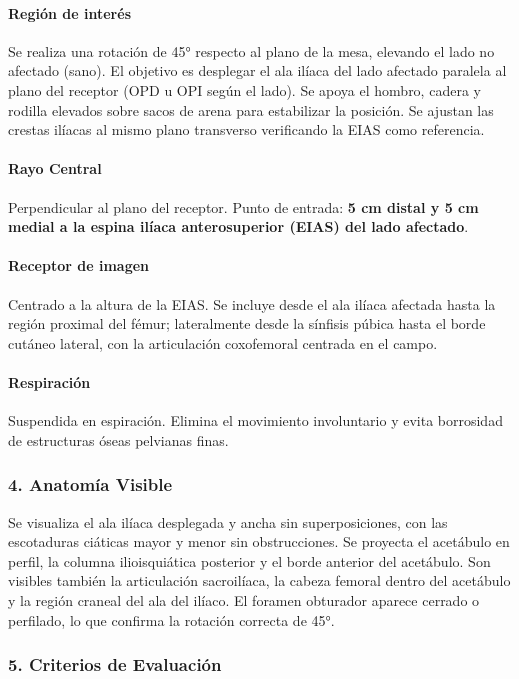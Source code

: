 	
	\paragraph{Región de interés}
	Se realiza una rotación de 45° respecto al plano de la mesa, elevando el lado no afectado (sano). El objetivo es desplegar el ala ilíaca del lado afectado paralela al plano del receptor (OPD u OPI según el lado). Se apoya el hombro, cadera y rodilla elevados sobre sacos de arena para estabilizar la posición. Se ajustan las crestas ilíacas al mismo plano transverso verificando la EIAS como referencia.
	
	\paragraph{Rayo Central}
	Perpendicular al plano del receptor. Punto de entrada: \textbf{5 cm distal y 5 cm medial a la espina ilíaca anterosuperior (EIAS) del lado afectado}.
	
	\paragraph{Receptor de imagen}
	Centrado a la altura de la EIAS. Se incluye desde el ala ilíaca afectada hasta la región proximal del fémur; lateralmente desde la sínfisis púbica hasta el borde cutáneo lateral, con la articulación coxofemoral centrada en el campo.
	
	\paragraph{Respiración}
	Suspendida en espiración. Elimina el movimiento involuntario y evita borrosidad de estructuras óseas pelvianas finas.
	
	\subsubsection*{4. Anatomía Visible}
	
	Se visualiza el ala ilíaca desplegada y ancha sin superposiciones, con las escotaduras ciáticas mayor y menor sin obstrucciones. Se proyecta el acetábulo en perfil, la columna ilioisquiática posterior y el borde anterior del acetábulo. Son visibles también la articulación sacroilíaca, la cabeza femoral dentro del acetábulo y la región craneal del ala del ilíaco. El foramen obturador aparece cerrado o perfilado, lo que confirma la rotación correcta de 45°.
	
	\subsubsection*{5. Criterios de Evaluación}
	
